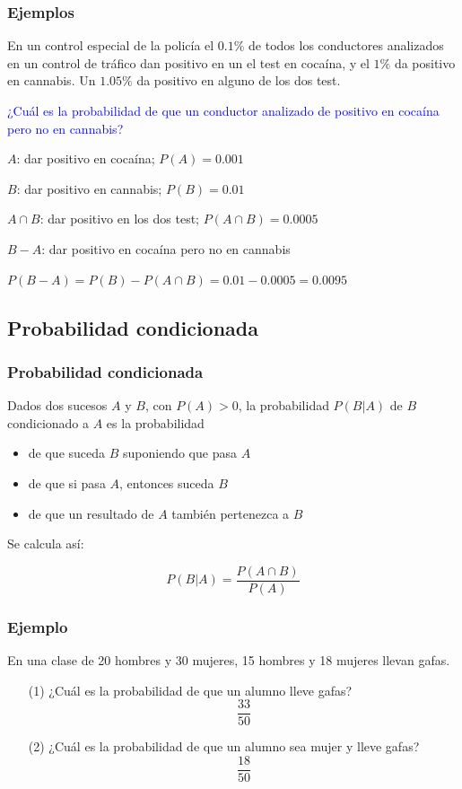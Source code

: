\documentclass[handout]{beamer}\usepackage[]{graphicx}\usepackage[]{color}
\newcommand{\blue}[1]{\textcolor{blue}{#1}}
\renewcommand{\emph}[1]{{\color{red}#1}}
\theoremstyle{plain}
\theoremstyle{definition}
\begin{document}
\begin{frame}
\frametitle{Ejemplos}


En un control especial de la policía el $0.1\%$ de todos los conductores analizados en un control de tráfico dan  positivo en un el test  en cocaína, y  el $1\%$ da positivo  en cannabis. Un $1.05\%$ da positivo en alguno de los dos test. \medskip


\blue{¿Cuál es la probabilidad de  que un conductor analizado de  positivo en cocaína pero no en cannabis?}
\pause\medskip

$A$: dar positivo en cocaína; $P(A)=0.001$
\medskip

$B$: dar positivo en cannabis; $P(B)=0.01$
\medskip

$A\cap B$: dar positivo en los dos test; $P(A\cap B)=0.0005$
\medskip


$B-A$: dar positivo en  cocaína pero no en cannabis
\bigskip

$P(B-A) =P(B)-P(A\cap B) =0.01-0.0005=0.0095$
\end{frame}



\subsection{Probabilidad condicionada}
\begin{frame}
\frametitle{Probabilidad condicionada}

Dados dos sucesos  $A$  y $B$, con $P(A)>0$, la  \emph{probabilidad $P(B|A)$ de $B$ condicionado a $A$} es la probabilidad
\begin{itemize}
\item de que suceda  $B$ suponiendo que pasa $A$ 
\item de que si pasa $A$, entonces suceda $B$
\item de que un resultado de $A$ también pertenezca a $B$
\end{itemize}
\medskip

Se calcula así:

$$
P(B|A)=\frac{P(A\cap B)}{P(A)}
$$


\end{frame}

\begin{frame}
\frametitle{Ejemplo}

En una clase de 20 hombres  y 30 mujeres, 15 hombres y 18 mujeres llevan gafas.
\medskip

\begin{enumerate} 
\item[(1)] ¿Cuál es la probabilidad de que un alumno lleve gafas?
\pause$$
\frac{33}{50}
$$
\pause
\item[(2)] ¿Cuál es la probabilidad de que un alumno sea mujer y lleve gafas?
\pause$$
\frac{18}{50}
$$
\end{enumerate}

\end{frame}
\end{document}
